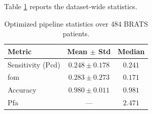 Table \ref{tab:optimized_stats} reports the dataset-wide statistics.
\begin{table}[htbp]
\centering

\caption{Optimized pipeline statistics over 484 BRATS patients.}
\label{tab:optimized_stats}
\begin{tabular}{lcc}
\toprule
Metric & Mean $\pm$ Std & Median \\
\midrule
Sensitivity (Pcd) & $0.248 \pm 0.178$ & $0.241$ \\
\gls{fom} & $0.283 \pm 0.273$ & $0.171$ \\
Accuracy & $0.980 \pm 0.011$ & $0.981$ \\
Pfa & --- & $2.471$ \\
\bottomrule
\end{tabular}
\end{table}

